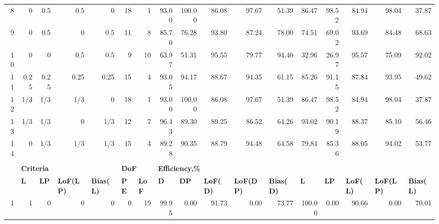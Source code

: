 \begin{landscape}
\begin{table}[p]
{\begin{tabular}{rrrrrrrrrrrrrrrrr}
8 & 0 & 0.5 & 0.5 & 0 & \multicolumn{1}{|r}{18} & 1 & \multicolumn{1}{|r}{93.00} & 100.00 & 86.08 & 97.67 & 51.39 &\multicolumn{1}{|r}{86.47} & 98.52 & 84.94 & 98.04 & 37.87 \\
9 & 0 & 0.5 & 0 & 0.5 & \multicolumn{1}{|r}{11} & 8 & \multicolumn{1}{|r}{85.70} & 76.28 & 93.80 & 87.24 & 78.00 & \multicolumn{1}{|r}{74.51} & 69.02 & 93.69 & 84.48 & 68.63 \\
10 & 0 & 0 & 0.5 & 0.5 & \multicolumn{1}{|r}{9} & 10 & \multicolumn{1}{|r}{63.97} & 51.31 & 95.55 & 79.77 & 94.40 & \multicolumn{1}{|r}{32.96} & 26.97 & 95.57 & 75.09 & 92.02 \\
11 & 0.25 & 0.25 & 0.25 & 0.25 & \multicolumn{1}{|r}{15} & 4 & \multicolumn{1}{|r}{93.05} & 94.17 & 88.67 & 94.35 & 61.15 & \multicolumn{1}{|r}{85.26} & 91.15 & 87.84 & 93.95 & 49.62 \\
12 & 1/3 & 1/3 & 1/3 & 0 & \multicolumn{1}{|r}{18} & 1 & \multicolumn{1}{|r}{93.00} & 100.00 & 86.08 & 97.67 & 51.39 & \multicolumn{1}{|r}{86.47} & 98.52 & 84.94 & 98.04 & 37.87 \\
13 & 1/3 & 1/3 & 0 & 1/3 & \multicolumn{1}{|r}{12} & 7 & \multicolumn{1}{|r}{96.43} & 89.30 & 89.25 & 86.52 & 64.26 & \multicolumn{1}{|r}{93.02} & 90.19 & 88.37 & 85.10 & 56.46 \\
14 & 0 & 1/3 & 1/3 & 1/3 & \multicolumn{1}{|r}{15} & 4 & \multicolumn{1}{|r}{89.28} & 90.35 & 88.79 & 94.48 & 64.58 & \multicolumn{1}{|r}{79.84} & 85.36 & 88.05 & 94.02 & 53.77 \\
 &  &  &  &  &  &  &  &  &  &  &  &  &  &  &  &  \\
\multicolumn{1}{l}{} & \multicolumn{4}{l}{{\bf Criteria}} & \multicolumn{2}{l}{{\bf DoF}} & \multicolumn{10}{l}{{\bf Efficiency,\%}} \\
\multicolumn{1}{l}{} & \multicolumn{1}{l}{{\bf L}} & \multicolumn{1}{l}{{\bf LP}} & \multicolumn{1}{l}{{\bf LoF(LP)}} & \multicolumn{1}{l}{{\bf Bias(L)}} & \multicolumn{1}{l}{{\bf PE}} & \multicolumn{1}{l}{{\bf LoF}} & \multicolumn{1}{l}{{\bf D}} & \multicolumn{1}{l}{{\bf DP}} & \multicolumn{1}{l}{{\bf LoF(D)}} & \multicolumn{1}{l}{{\bf LoF(DP)}} & \multicolumn{1}{l}{{\bf Bias(D)}} & \multicolumn{1}{l}{{\bf L}} & \multicolumn{1}{l}{{\bf LP}} & \multicolumn{1}{l}{{\bf LoF(L)}} & \multicolumn{1}{l}{{\bf LoF(LP)}} & \multicolumn{1}{l}{{\bf Bias(L)}} \\
1 & 1 & 0 & 0 & 0 & \multicolumn{1}{|r}{0} & 19 & \multicolumn{1}{|r}{99.95} & 0.00 & 91.73 & 0.00 & 73.77 & \multicolumn{1}{|r}{100.00} & 0.00 & 90.66 & 0.00 & 70.01 \\

\end{tabular}}
\end{table}
\end{landscape}
